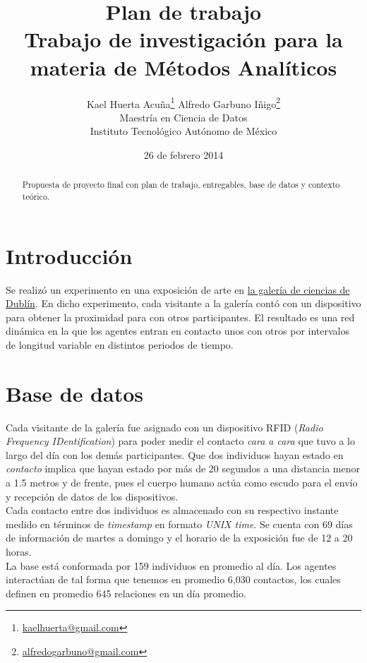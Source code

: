 \documentclass[10pt]{article}
\title{Plan de trabajo \\ {\large Trabajo de investigación
    para la materia de Métodos Analíticos} }
\author{Kael Huerta Acuña\footnote{
  \href{mailto:kaelhuerta@gmail.com}{kaelhuerta@gmail.com} }
  \qquad Alfredo Garbuno Iñigo\footnote{
  \href{mailto:alfredogarbuno@gmail.com}{alfredogarbuno@gmail.com} }\\
    {\small Maestría en Ciencia de Datos} \\
    {\small  Instituto Tecnológico Autónomo de México}}
\date{26 de febrero 2014}
\begin{document}
\maketitle

\begin{abstract}
Propuesta de proyecto final con plan de trabajo, entregables, base de datos y
contexto teórico.
\end{abstract}



\section{Introducción}
\label{sec:intro}

Se realizó un experimento en una exposición de arte en \href{https://dublin.sciencegallery.com/}{la galería de ciencias de Dublín}. En dicho experimento,
cada visitante a la galería contó con un dispositivo para obtener la proximidad
para con otros participantes. El resultado es una red dinámica en la que los
agentes entran en contacto unos con otros por intervalos de longitud variable
en distintos periodos de tiempo.\\



\section{Base de datos}
\label{sec:datos}

Cada visitante de la galería fue asignado con un dispositivo RFID ({\it Radio
Frequency IDentification}) para poder medir el contacto {\it cara a cara} que
tuvo a lo largo del día con los demás participantes. Que dos individuos hayan
estado en {\it contacto} implica que hayan estado por más de 20 segundos a una
distancia menor a 1.5 metros y de frente, pues el cuerpo humano actúa como
escudo para el envío y recepción de datos de los dispositivos.\\

Cada contacto entre dos individuos es almacenado con su respectivo instante
medido en términos de {\it timestamp} en formato {\it UNIX time}. Se cuenta
con 69 días de información de martes a domingo y el horario de la exposición
fue de 12 a 20 horas.\\

La base está conformada por 159 individuos en promedio al día. Los agentes interactúan de tal forma que tenemos en promedio 6,030 contactos, los cuales definen en promedio 645 relaciones en un día promedio. 
\end{document}
